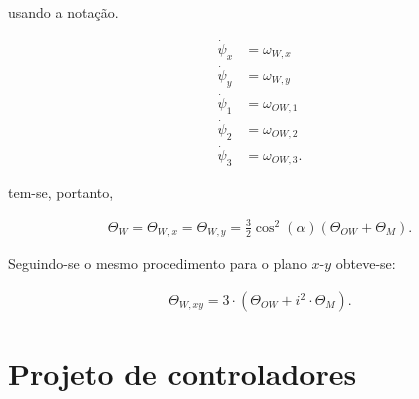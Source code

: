 usando a notação.

\begin{align*}
\dot{\psi}_x &= \omega_{W,x} \\
\dot{\psi}_y &= \omega_{W,y} \\
\dot{\psi}_1 &= \omega_{OW,1} \\
\dot{\psi}_2 &= \omega_{OW,2} \\
\dot{\psi}_3 &= \omega_{OW,3}.
\end{align*}

tem-se, portanto,

\begin{align*}
\Theta_{W} = \Theta_{W,x} = \Theta_{W,y} = \frac{3}{2} \cos^2(\alpha) (\Theta_{OW} + \Theta_M).
\end{align*}

Seguindo-se o mesmo procedimento para o plano $x$-$y$ obteve-se:

\begin{align*}
    \Theta_{W,xy} = 3 \cdot (\Theta_{OW} + i^2 \cdot \Theta_M).
\end{align*}


\section{Projeto de controladores}
\label{sec:projetocontroladores}

\clearpage